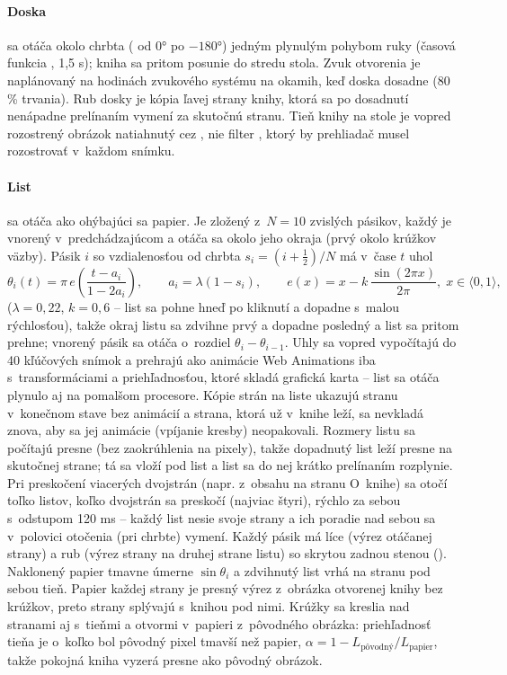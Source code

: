 \documentclass[11pt, a4paper]{article}
\begin{document}
\paragraph{Doska} sa otáča okolo chrbta ( od $0°$ po $-180°$) jedným plynulým
pohybom ruky (časová funkcia , 1,5 s); kniha sa pritom
posunie do stredu stola. Zvuk otvorenia je naplánovaný na hodinách zvukového systému na
okamih, keď doska dosadne (80 \% trvania). Rub dosky je kópia ľavej strany knihy, ktorá sa
po dosadnutí nenápadne prelínaním vymení za skutočnú stranu. Tieň knihy na stole je vopred
rozostrený obrázok natiahnutý cez , nie filter , ktorý
by prehliadač musel rozostrovať v~každom snímku.

\paragraph{List} sa otáča ako ohýbajúci sa papier. Je zložený z~$N = 10$ zvislých pásikov,
každý je vnorený v~predchádzajúcom a otáča sa okolo jeho okraja (prvý okolo krúžkov väzby).
Pásik $i$ so vzdialenosťou od chrbta $s_i = (i + \tfrac12)/N$ má v~čase $t$ uhol
\begin{equation}
  \theta_i(t) = \pi\, e\!\left(\frac{t - a_i}{1 - 2a_i}\right), \qquad a_i = \lambda (1 - s_i),
  \qquad e(x) = x - k\,\frac{\sin(2\pi x)}{2\pi}, \; x \in \langle 0, 1 \rangle,
\end{equation}
($\lambda = 0{,}22$, $k = 0{,}6$ – list sa pohne hneď po kliknutí a dopadne s~malou
rýchlosťou), takže okraj listu sa zdvihne prvý a dopadne posledný a list sa pritom prehne;
vnorený pásik sa otáča o~rozdiel $\theta_i - \theta_{i-1}$. Uhly sa vopred vypočítajú do
40 kľúčových snímok a prehrajú ako animácie Web Animations iba s~transformáciami
a priehľadnosťou, ktoré skladá grafická karta – list sa otáča plynulo aj na pomalšom
procesore. Kópie strán na liste ukazujú stranu v~konečnom stave bez animácií a strana, ktorá
už v~knihe leží, sa nevkladá znova, aby sa jej animácie (vpíjanie kresby) neopakovali. Rozmery
listu sa počítajú presne (bez zaokrúhlenia na pixely), takže dopadnutý list leží presne na
skutočnej strane; tá sa vloží pod list a list sa do nej krátko prelínaním rozplynie.
Pri preskočení viacerých dvojstrán (napr. z~obsahu na stranu O~knihe) sa otočí toľko listov,
koľko dvojstrán sa preskočí (najviac štyri), rýchlo za sebou s~odstupom 120 ms – každý list
nesie svoje strany a ich poradie nad sebou sa v~polovici otočenia (pri chrbte) vymení. Každý pásik má líce
(výrez otáčanej strany) a rub (výrez strany na druhej strane listu) so skrytou zadnou stenou
(). Naklonený papier tmavne úmerne $\sin\theta_i$ a zdvihnutý list
vrhá na stranu pod sebou tieň. Papier každej strany je presný výrez z~obrázka otvorenej knihy
bez krúžkov, preto strany splývajú s~knihou pod nimi. Krúžky sa kreslia nad stranami aj
s~tieňmi a otvormi v~papieri z~pôvodného obrázka: priehľadnosť tieňa je o~koľko bol pôvodný
pixel tmavší než papier, $\alpha = 1 - L_{\text{pôvodný}} / L_{\text{papier}}$, takže pokojná
kniha vyzerá presne ako pôvodný obrázok.
\end{document}
